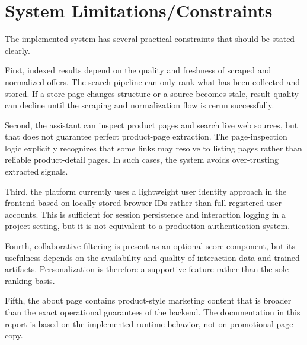 \documentclass[12pt,a4paper,oneside]{report}
\begin{document}
\section{System Limitations/Constraints}
The implemented system has several practical constraints that should be stated clearly.

First, indexed results depend on the quality and freshness of scraped and normalized offers. The search pipeline can only rank what has been collected and stored. If a store page changes structure or a source becomes stale, result quality can decline until the scraping and normalization flow is rerun successfully.

Second, the assistant can inspect product pages and search live web sources, but that does not guarantee perfect product-page extraction. The page-inspection logic explicitly recognizes that some links may resolve to listing pages rather than reliable product-detail pages. In such cases, the system avoids over-trusting extracted signals.

Third, the platform currently uses a lightweight user identity approach in the frontend based on locally stored browser IDs rather than full registered-user accounts. This is sufficient for session persistence and interaction logging in a project setting, but it is not equivalent to a production authentication system.

Fourth, collaborative filtering is present as an optional score component, but its usefulness depends on the availability and quality of interaction data and trained artifacts. Personalization is therefore a supportive feature rather than the sole ranking basis.

Fifth, the about page contains product-style marketing content that is broader than the exact operational guarantees of the backend. The documentation in this report is based on the implemented runtime behavior, not on promotional page copy.
\end{document}
